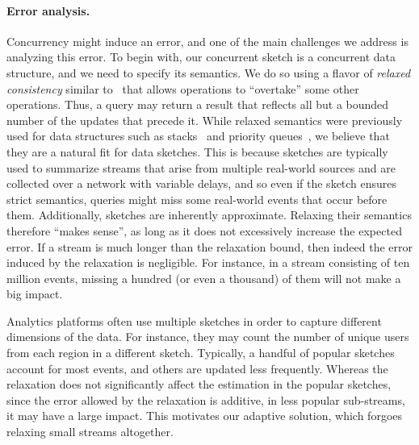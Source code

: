\paragraph{Error analysis.}
Concurrency might induce an error, and one of the main challenges we address is analyzing this error.
To begin with, our concurrent sketch is a concurrent data structure, and 
we need to specify its  semantics. We do so using a flavor of 
\emph{relaxed consistency} similar to~\cite{Henzinger, alistarh2018distributionally, talmage2014improving}    %
that allows operations to ``overtake'' some other operations.  
Thus, a query may return a result that reflects all but a bounded number of the updates
that precede it. 
While relaxed semantics were previously used for data structures such as stacks~\cite{Henzinger}
and priority queues~\cite{alistarh, rihani2014multiqueues}, we believe that they are a natural fit for data sketches. 
This is because sketches are typically used to summarize streams that  arise from multiple real-world sources  
and are collected over a network with variable delays, and so even if the sketch ensures strict semantics, 
queries might miss some real-world events that occur before them. Additionally, sketches are inherently approximate.
Relaxing their semantics therefore ``makes sense'', as long as it does not excessively increase the expected error.
If a stream is much longer than the relaxation bound, then indeed the error induced by the relaxation is negligible. For instance, in a stream consisting of ten million events, missing a hundred (or even a thousand) of them will not make a big impact. 

Analytics platforms often use multiple sketches in order to capture different dimensions of the data. For instance, they may count the number of unique users from each region in a different sketch. 
Typically, a handful of popular sketches account for most events, and others are updated less frequently. Whereas the relaxation does not significantly affect the estimation in the popular sketches, since the error allowed by the relaxation is additive, in less popular sub-streams, it may have a large impact. 
This motivates our adaptive solution, which forgoes relaxing small streams altogether. 


